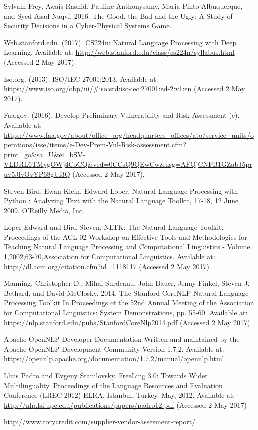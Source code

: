 \documentclass[12pt,journal,compsoc]{IEEEtran}
\begin{document}
\begin{thebibliography}{1}

 Sylvain Frey, Awais Rashid, Pauline Anthonysamy, Maria Pinto-Albuquerque, and Syed Asad Naqvi. 2016.  The Good, the Bad and the Ugly: A Study of Security Decisions in a Cyber-Physical Systems Game.

 Web.stanford.edu. (2017). CS224n: Natural Language Processing with Deep Learning. Available at: \url{http://web.stanford.edu/class/cs224n/syllabus.html} (Accessed 2 May 2017). 

 Iso.org. (2013). ISO/IEC 27001:2013. Available at: \url{https://www.iso.org/obp/ui/\#iso:std:iso-iec:27001:ed-2:v1:en} (Accessed 2 May 2017).

 Faa.gov. (2016). Develop Preliminary Vulnerability and Risk Assessment (e). Available at: \url{https://www.faa.gov/about/office_org/headquarters_offices/ato/service_units/operations/isse/items/e-Dev-Prem-Vul-Risk-assessment.cfm?print=go\&sa=U&ei=bSV-VLDRL6TMygOWj4CoCQ\&ved=0CCsQ9QEwCw\&usg=AFQjCNFB1GZabJ5pruv5JfvOvYP68gUi3Q} (Accessed 2 May 2017).

 Steven Bird, Ewan Klein, Edward Loper. Natural Language Processing with Python : Analyzing Text with the Natural Language Toolkit, 17-18, 12 June 2009. O'Reilly Media, Inc.

 Loper Edward and Bird Steven. NLTK: The Natural Language Toolkit. Proceedings of the ACL-02 Workshop on Effective Tools and Methodologies for Teaching Natural Language Processing and Computational Linguistics - Volume 1,2002,63-70,Association for Computational Linguistics. Available at: \url{http://dl.acm.org/citation.cfm?id=1118117} (Accessed 2 May 2017).

 Manning, Christopher D., Mihai Surdeanu, John Bauer, Jenny Finkel, Steven J. Bethard, and David McClosky. 2014. The Stanford CoreNLP Natural Language Processing Toolkit In Proceedings of the 52nd Annual Meeting of the Association for Computational Linguistics: System Demonstrations, pp. 55-60. Available at: \url{https://nlp.stanford.edu/pubs/StanfordCoreNlp2014.pdf} (Accessed 2 May 2017).

 Apache OpenNLP Developer Documentation Written and maintained by the Apache OpenNLP Development Community Version 1.7.2. Available at: \url{https://opennlp.apache.org/documentation/1.7.2/manual/opennlp.html}

 Lluis Padro and Evgeny Stanilovsky. FreeLing 3.0: Towards Wider Multilinguality. Proceedings of the Language Resources and Evaluation Conference (LREC 2012) ELRA. Istanbul, Turkey. May, 2012. Available at: \url{http://nlp.lsi.upc.edu/publications/papers/padro12.pdf} (Accessed 2 May 2017)

 \url{http://www.torycredit.com/supplier-vendor-assesment-report/}
\end{thebibliography}
\end{document}
